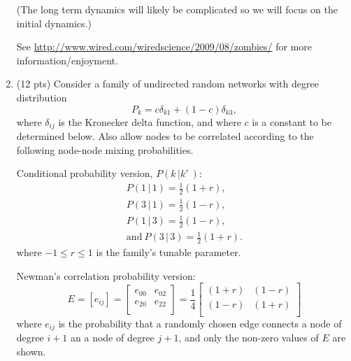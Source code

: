 \begin{enumerate}
  (The long term dynamics will likely be complicated so 
  we will focus on
  the initial dynamics.)
  
  See \href{http://www.wired.com/wiredscience/2009/08/zombies/}{http://www.wired.com/wiredscience/2009/08/zombies/}
  for more information/enjoyment.
  
  
  
   \solutionstart


   \solutionend











\item (12 pts)
  Consider a family of undirected random networks with degree distribution
  $$ 
  P_{k} = c \delta_{k1} + (1-c) \delta_{k3},
  $$
  where $\delta_{ij}$ is the Kronecker delta function,
  and where $c$ is a constant to be determined below.
  Also allow nodes to be correlated according to the following
  node-node mixing probabilities.  

  Conditional probability version, $P(k\, |k'\ )$:
  \begin{gather}
    P(1\, |\, 1) = \frac{1}{2}{(1+r)}, \nonumber \\
    P(3\, |\, 1) = \frac{1}{2}{(1-r)}, \nonumber \\
    P(1\, |\, 3) = \frac{1}{2}{(1-r)}, \nonumber \\
    \mbox{and} \ P(3\, |\, 3) = \frac{1}{2}{(1+r)}. \nonumber
  \end{gather}
  where $-1 \le r \le 1$ is the family's tunable parameter.

  Newman's correlation probability version:
  $$
  E 
  =
  [e_{ij}]
  =
  \left[
    \begin{array}{cc}
      e_{00} & e_{02} \\
      e_{20} & e_{22} \\
    \end{array}
  \right]
  =
  \frac{1}{4}
  \left[
    \begin{array}{cc}
      (1+r) & (1-r) \\
      (1-r) & (1+r) \\
    \end{array}
  \right]
  $$
  where $e_{ij}$ is the probability that a 
  randomly chosen edge connects
  a node of degree $i+1$ an
  a node of degree $j+1$, 
  and only the non-zero
  values of $E$ are shown.


\end{enumerate}
